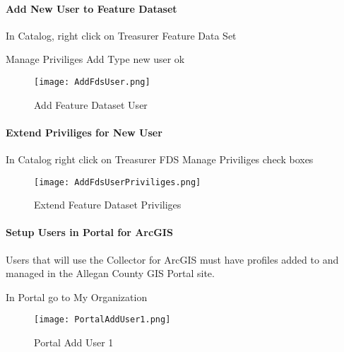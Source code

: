  \paragraph[Add New User to Feature Dataset]{\Large Add New User to Feature Dataset\texorpdfstring{\\}{}}
 \vspace{.35in}

 In Catalog, \rtArrow right click on Treasurer Feature Data Set
 \vspace{.15in}
  
 \rtArrow Manage \rtArrow Priviliges \rtArrow Add \rtArrow Type new user \rtArrow ok
 \vspace{.5in}

 \begin{figure}[h!]
 \centering
     \texttt{[image: AddFdsUser.png]}
 \caption{Add Feature Dataset User}
 \end{figure}
 \clearpage
 \paragraph[Extend Priviliges for New User]{\Large Extend Priviliges for New User\texorpdfstring{\\}{}}
 \vspace{.5in}

 In Catalog \rtArrow right click on Treasurer FDS \rtArrow Manage \rtArrow Priviliges \rtArrow check boxes
 \vspace{.5in}

 \begin{figure}[h!]
 \centering
     \texttt{[image: AddFdsUserPriviliges.png]}
 \caption{Extend Feature Dataset Priviliges}
 \end{figure}
 \clearpage
 \paragraph[Setup Users in Portal for ArcGIS]{\Large Setup Users in Portal for ArcGIS\texorpdfstring{\\}{}}
 \vspace{.5in}

 \noindent Users that will use the Collector for ArcGIS must have profiles added to and managed in the Allegan County GIS Portal site.
 \vspace{.5in}

 In Portal go to My Organization
 \begin{figure}[h!]
 \centering
     \texttt{[image: PortalAddUser1.png]}
 \caption{Portal Add User 1}
 \end{figure}
 \clearpage

